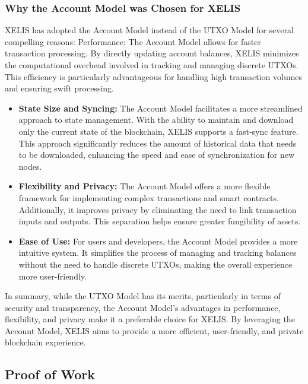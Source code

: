 \documentclass[10pt,a4paper,twocolumn]{article}
\begin{document}
\subsubsection{Why the Account Model was Chosen for XELIS}

XELIS has adopted the Account Model instead of the UTXO Model for several compelling reasons:
Performance: The Account Model allows for faster transaction processing. By directly updating account balances, XELIS minimizes the computational overhead involved in tracking and managing discrete UTXOs. This efficiency is particularly advantageous for handling high transaction volumes and ensuring swift processing.\\
\begin{itemize}
\item \textbf{State Size and Syncing:} The Account Model facilitates a more streamlined approach to state management. With the ability to maintain and download only the current state of the blockchain, XELIS supports a fast-sync feature. This approach significantly reduces the amount of historical data that needs to be downloaded, enhancing the speed and ease of synchronization for new nodes.\\

\item \textbf{Flexibility and Privacy:} The Account Model offers a more flexible framework for implementing complex transactions and smart contracts. Additionally, it improves privacy by eliminating the need to link transaction inputs and outputs. This separation helps ensure greater fungibility of assets.\\

\item \textbf{Ease of Use:} For users and developers, the Account Model provides a more intuitive system. It simplifies the process of managing and tracking balances without the need to handle discrete UTXOs, making the overall experience more user-friendly.\\
\end{itemize}
In summary, while the UTXO Model has its merits, particularly in terms of security and transparency, the Account Model's advantages in performance, flexibility, and privacy make it a preferable choice for XELIS. By leveraging the Account Model, XELIS aims to provide a more efficient, user-friendly, and private blockchain experience.\\

\subsection{Proof of Work}
\end{document}

